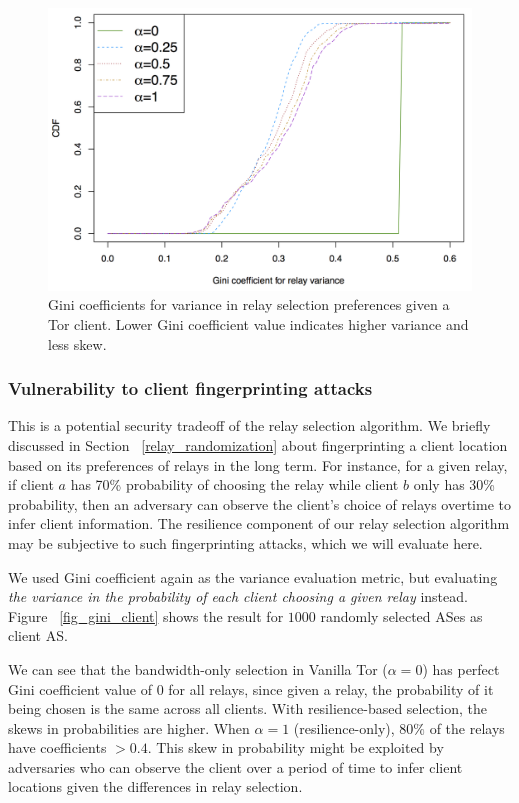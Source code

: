 \begin{figure}[ht!]
\centering
\includegraphics[width=.4\textwidth]{figure/gini_relay_variance}
\caption{Gini coefficients for variance in relay selection preferences given a Tor client. Lower Gini coefficient value indicates higher variance and less skew. \label{fig_gini}}
\end{figure}

\subsubsection{Vulnerability to client fingerprinting attacks}
This is a potential security tradeoff of the relay selection algorithm. We briefly discussed in Section ~\ref{relay_randomization} about fingerprinting a client location based on its preferences of relays in the long term. For instance, for a given relay, if client $a$ has 70\% probability of choosing the relay while client $b$ only has 30\% probability, then an adversary can observe the client's choice of relays overtime to infer client information. The resilience component of our relay selection algorithm may be subjective to such fingerprinting attacks, which we will evaluate here. 

We used Gini coefficient again as the variance evaluation metric, but evaluating \emph{the variance in the probability of each client choosing a given relay} instead. Figure ~\ref{fig_gini_client} shows the result for $1000$ randomly selected ASes as client AS. 

We can see that the bandwidth-only selection in Vanilla Tor ($\alpha = 0$) has perfect Gini coefficient value of 0 for all relays, since given a relay, the probability of it being chosen is the same across all clients. With resilience-based selection, the skews in probabilities are higher. When $\alpha = 1$ (resilience-only), $80\%$ of the relays have coefficients $> 0.4$. This skew in probability might be exploited by adversaries who can observe the client over a period of time to infer client locations given the differences in relay selection.

